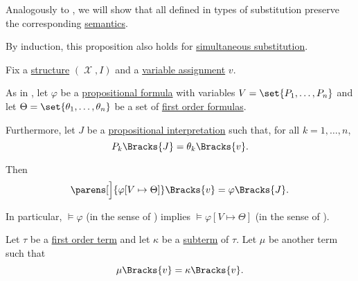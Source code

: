 \begin{proposition}\label{thm:first_order_substitution_equivalence}
  Analogously to , we will show that all defined in  types of substitution preserve the corresponding \hyperref[def:first_order_semantics]{semantics}.

  By induction, this proposition also holds for \hyperref[def:propositional_substitution/simultaneous]{simultaneous substitution}.

  Fix a \hyperref[def:first_order_structure]{structure} \( (\mscrX, I) \) and a \hyperref[def:first_order_valuation/variable_assignment]{variable assignment} \( v \).

  \begin{thmenum}
     As in , let \( \varphi \) be a \hyperref[def:propositional_syntax/formula]{propositional formula} with variables \( {V = \set{ P_1, \ldots, P_n }} \) and let \( \Theta = \set{ \theta_1, \ldots, \theta_n } \) be a set of \hyperref[def:first_order_syntax/formula]{first order formulas}.

    Furthermore, let \( J \) be a \hyperref[def:propositional_valuation/interpretation]{propositional interpretation} such that, for all \( k = 1, \ldots, n \),
    \begin{equation}\label{eq:thm:first_order_substitution_equivalence/propositional/compatibility}
      P_k\Bracks{J} = \theta_k\Bracks{v}.
    \end{equation}

    Then
    \begin{equation}\label{eq:thm:first_order_substitution_equivalence/propositional}
      \parens[\Big]{ \varphi[V \mapsto \Theta] }\Bracks{v} = \varphi \Bracks{J}.
    \end{equation}

    In particular, \( \vDash \varphi \) (in the sense of ) implies \( \vDash \varphi[V \mapsto \Theta] \) (in the sense of ).

     Let \( \tau \) be a \hyperref[def:first_order_syntax/term]{first order term} and let \( \kappa \) be a \hyperref[def:first_order_syntax/subterm]{subterm} of \( \tau \). Let \( \mu \) be another term such that
    \begin{equation}\label{eq:thm:first_order_substitution_equivalence/term_in_term/compatibility}
      \mu\Bracks{v} = \kappa\Bracks{v}.
    \end{equation}


\end{thmenum}
\end{proposition}
